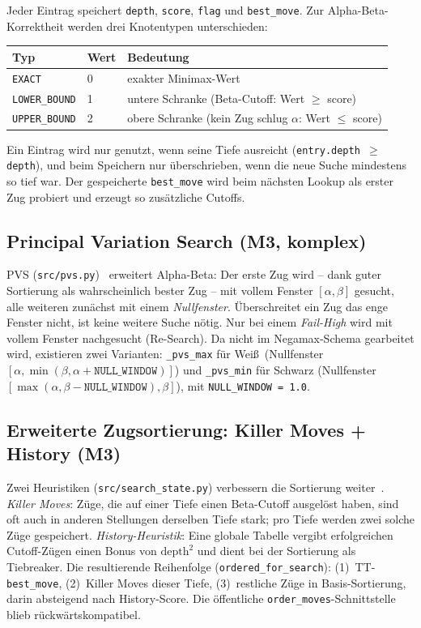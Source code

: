 \documentclass[11pt,a4paper]{article}
\newcommand{\code}[1]{\texttt{\small #1}}
\begin{document}
Jeder Eintrag speichert \code{depth}, \code{score}, \code{flag} und
\code{best\_move}.
Zur Alpha-Beta-Korrektheit werden drei Knotentypen unterschieden:

\begin{center}
\begin{tabular}{lll}
\toprule
\textbf{Typ} & \textbf{Wert} & \textbf{Bedeutung} \\
\midrule
\code{EXACT}       & 0 & exakter Minimax-Wert \\
\code{LOWER\_BOUND} & 1 & untere Schranke (Beta-Cutoff: Wert $\geq$ score) \\
\code{UPPER\_BOUND} & 2 & obere Schranke (kein Zug schlug $\alpha$: Wert $\leq$ score) \\
\bottomrule
\end{tabular}
\end{center}

Ein Eintrag wird nur genutzt, wenn seine Tiefe ausreicht
(\code{entry.depth $\geq$ depth}), und beim Speichern nur \"uberschrieben, wenn
die neue Suche mindestens so tief war.
Der gespeicherte \code{best\_move} wird beim n\"achsten Lookup als erster Zug
probiert und erzeugt so zus\"atzliche Cutoffs.

\subsection{Principal Variation Search (M3, komplex)}
PVS (\code{src/pvs.py})~\cite{cpw} erweitert Alpha-Beta: Der erste Zug wird -- dank guter
Sortierung als wahrscheinlich bester Zug -- mit vollem Fenster $[\alpha,\beta]$
gesucht, alle weiteren zun\"achst mit einem \emph{Nullfenster}.
\"Uberschreitet ein Zug das enge Fenster nicht, ist keine weitere Suche n\"otig.
Nur bei einem \emph{Fail-High} wird mit vollem Fenster nachgesucht (Re-Search).
Da nicht im Negamax-Schema gearbeitet wird, existieren zwei Varianten:
\code{\_pvs\_max} f\"ur Wei\ss\ (Nullfenster
$[\alpha,\min(\beta,\alpha+\texttt{NULL\_WINDOW})]$) und \code{\_pvs\_min} f\"ur
Schwarz (Nullfenster $[\max(\alpha,\beta-\texttt{NULL\_WINDOW}),\beta]$), mit
\code{NULL\_WINDOW = 1.0}.

\subsection{Erweiterte Zugsortierung: Killer Moves + History (M3)}
Zwei Heuristiken (\code{src/search\_state.py}) verbessern die Sortierung
weiter~\cite{cpw}.
\emph{Killer Moves}: Z\"uge, die auf einer Tiefe einen Beta-Cutoff ausgel\"ost
haben, sind oft auch in anderen Stellungen derselben Tiefe stark; pro Tiefe
werden zwei solche Z\"uge gespeichert.
\emph{History-Heuristik}: Eine globale Tabelle vergibt erfolgreichen
Cutoff-Z\"ugen einen Bonus von $\text{depth}^2$ und dient bei der Sortierung als
Tiebreaker.
Die resultierende Reihenfolge (\code{ordered\_for\_search}):
(1)~TT-\code{best\_move}, (2)~Killer Moves dieser Tiefe, (3)~restliche Z\"uge in
Basis-Sortierung, darin absteigend nach History-Score.
Die \"offentliche \code{order\_moves}-Schnittstelle blieb r\"uckw\"artskompatibel.
\end{document}
